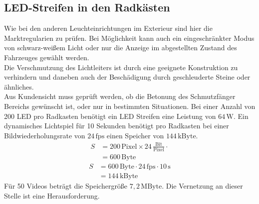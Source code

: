\subsection{LED-Streifen in den Radkästen}
Wie bei den anderen Leuchteinrichtungen im Exterieur sind hier die Marktregularien zu prüfen. Bei Möglichkeit kann auch ein eingeschränkter Modus von schwarz-weißem Licht oder nur die Anzeige im abgestellten Zustand des Fahrzeuges gewählt werden. \\
Die Verschmutzung des Lichtleiters ist durch eine geeignete Konstruktion zu verhindern und daneben auch der Beschädigung durch geschleuderte Steine oder ähnliches. \\
Aus Kundensicht muss geprüft werden, ob die Betonung des Schmutzfänger Bereichs gewünscht ist, oder nur in bestimmten Situationen.
Bei einer Anzahl von 200 LED pro Radkasten benötigt ein LED Streifen eine Leistung von $ 64\,\mathrm{W} $.
Ein dynamisches Lichtspiel für 10 Sekunden benötigt pro Radkasten bei einer Bildwiederholungsrate von $ 24\,\mathrm{fps} $ einen Speicher von $ 144\,\mathrm{kByte}$. \\
\begin{align}
	S &= 200\,\mathrm{Pixel} \times 24\,\frac{\mathrm{Bit}}{\mathrm{Pixel}} \cdot \\
	&= 600\,\mathrm{Byte}
\end{align}
\begin{align}
	S &= 600\,\mathrm{Byte} \cdot 24\,\mathrm{fps} \cdot 10\,\mathrm{s}\\
	&= 144\,\mathrm{kByte}
\end{align}
Für 50 Videos beträgt die Speichergröße $ 7,2\,\mathrm{MByte} $.
Die Vernetzung an dieser Stelle ist eine Herausforderung.
